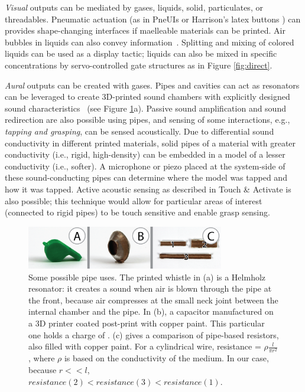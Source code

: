 \emph{Visual} outputs can be mediated by gases, liquids, solid, particulates, or threadables.  Pneumatic actuation (as in PneUIs \cite{Yao-pneui} or Harrison's latex buttons \cite{Harrison-buttons}) can provides shape-changing interfaces if maelleable materials can be printed. 
Air bubbles in liquids can also convey information~\cite{Heiner1999Percolator}. Splitting and mixing of colored liquids can be used as a display tactic; liquids can also be mixed in specific concentrations by servo-controlled gate structures as in Figure \ref{fig:direct}. %

\emph{Aural} outputs can be created with gases.  Pipes and cavities can act as resonators can be leveraged to create 3D-printed sound chambers with explicitly designed sound characteristics~\cite{Zoran-flute} (see Figure \ref{fig:speculative}a).  %
Passive sound amplification and sound redirection are also possible using pipes, and sensing of some interactions, e.g., \emph{tapping and grasping}, can be sensed acoustically.  Due to differential sound conductivity in different printed materials, solid pipes of a material with greater conductivity (i.e., rigid, high-density) can be embedded in a model of a lesser conductivity (i.e., softer).  A microphone or piezo placed at the system-side of these sound-conducting pipes can determine where the model was tapped and how it was tapped.  Active acoustic sensing as described in Touch \& Activate \cite{Ono-touchandactivate} is also possible; this technique would allow for particular areas of interest (connected to rigid pipes) to be touch sensitive and enable grasp sensing.

\begin{figure}[h]
\centering
    \includegraphics[width=3.4in]{figures/speculative.png}
\caption{Some possible pipe uses.  The printed whistle in (a) is a Helmholz resonator: it creates a sound when air is blown through the pipe at the front, because air compresses at the small neck joint between the internal chamber and the pipe.  In (b), a capacitor manufactured on a 3D printer coated post-print with copper paint.  This particular one holds a charge of .  (c) gives a comparison of pipe-based resistors, also filled with copper paint.  For a cylindrical wire, resistance = $\rho\frac{l}{\pi r^2}$, where $\rho$ is based on the conductivity of the medium.  In our case, because $r << l$, $resistance(2) < resistance(3) < resistance(1)$.}
\label{fig:speculative}
\end{figure}


